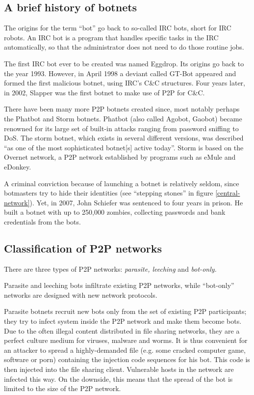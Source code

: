 \documentclass{llncs}
\begin{document}
\subsection{A brief history of botnets}
The origins for the term ``bot'' go back to so-called IRC bots, short
for IRC robots. An IRC bot is a program that handles specific tasks in
the IRC automatically, so that the administrator does not need to do
those routine jobs.

The first IRC bot ever to be created was named Eggdrop. Its origins go
back to the year 1993. However, in April 1998 a deviant called
GT-Bot appeared and formed the first malicious botnet, using IRC's
C\&C structures. Four years later, in 2002, Slapper was the first
botnet to make use of P2P for C\&C.\cite{li2009botnet}

There have been many more P2P botnets created since, most notably
perhaps the Phatbot and Storm botnets. Phatbot (also called Agobot,
Gaobot) became renowned for its large set of built-in attacks ranging
from password sniffing to DoS.\cite{cooke2005zombie} The storm botnet,
which exists in several different versions, was described ``as one of
the most sophisticated botnet[s] active
today''\cite{davis2008sybil}. Storm is based on the Overnet network, a
P2P network established by programs such as eMule and eDonkey.

 A criminal conviction because of launching a botnet is relatively
 seldom, since botmasters try to hide their identities (see ``stepping
 stones'' in figure \ref{central-network}). Yet, in 2007, John
 Schiefer was sentenced to four years in prison. He built a botnet
 with up to 250,000 zombies, collecting passwords and bank credentials
 from the bots.\cite{BotnetCrime}


\subsection{Classification of P2P networks}
\label{ClassificP2P}
There are three types of P2P networks: {\it parasite, leeching} and
{\it bot-only.}\cite{wang2009systematic} 

Parasite and leeching bots infiltrate existing P2P networks, while
``bot-only'' networks are designed with new network protocols. 

Parasite botnets recruit new bots only from the set of existing P2P
participants; they try to infect system inside the P2P network and
make them become bots. Due to the often illegal content distributed in
file sharing networks, they are a perfect culture medium for viruses,
malware and worms. It is thus convenient for an attacker to spread a
highly-demanded file (e.g. some cracked computer game, software or
porn) containing the injection code sequences for his bot. This code is
then injected into the file sharing client. Vulnerable hosts in the
network are infected this way. On the downside, this means that the
spread of the bot is limited to the size of the P2P network.
\end{document}
